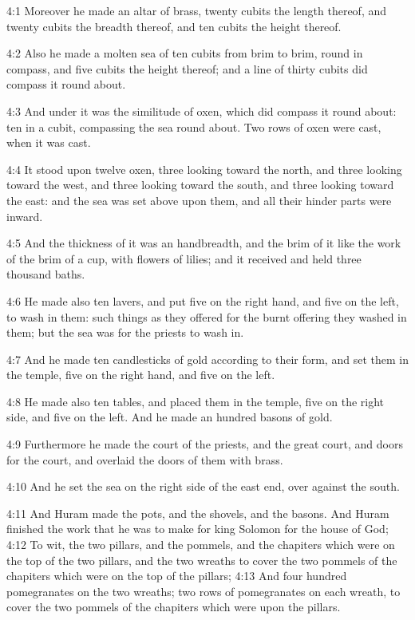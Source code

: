 4:1 Moreover he made an altar of brass, twenty cubits the length
thereof, and twenty cubits the breadth thereof, and ten cubits the
height thereof.

4:2 Also he made a molten sea of ten cubits from brim to brim, round
in compass, and five cubits the height thereof; and a line of thirty
cubits did compass it round about.

4:3 And under it was the similitude of oxen, which did compass it
round about: ten in a cubit, compassing the sea round about. Two rows
of oxen were cast, when it was cast.

4:4 It stood upon twelve oxen, three looking toward the north, and
three looking toward the west, and three looking toward the south, and
three looking toward the east: and the sea was set above upon them,
and all their hinder parts were inward.

4:5 And the thickness of it was an handbreadth, and the brim of it
like the work of the brim of a cup, with flowers of lilies; and it
received and held three thousand baths.

4:6 He made also ten lavers, and put five on the right hand, and five
on the left, to wash in them: such things as they offered for the
burnt offering they washed in them; but the sea was for the priests to
wash in.

4:7 And he made ten candlesticks of gold according to their form, and
set them in the temple, five on the right hand, and five on the left.

4:8 He made also ten tables, and placed them in the temple, five on
the right side, and five on the left. And he made an hundred basons of
gold.

4:9 Furthermore he made the court of the priests, and the great court,
and doors for the court, and overlaid the doors of them with brass.

4:10 And he set the sea on the right side of the east end, over
against the south.

4:11 And Huram made the pots, and the shovels, and the basons. And
Huram finished the work that he was to make for king Solomon for the
house of God; 4:12 To wit, the two pillars, and the pommels, and the
chapiters which were on the top of the two pillars, and the two
wreaths to cover the two pommels of the chapiters which were on the
top of the pillars; 4:13 And four hundred pomegranates on the two
wreaths; two rows of pomegranates on each wreath, to cover the two
pommels of the chapiters which were upon the pillars.

